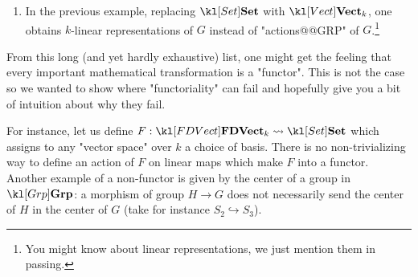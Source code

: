 \documentclass[main.tex]{subfiles}
\begin{document}
\begin{exmps}
\begin{enumerate}
		\item In the previous example, replacing $\catSet$ with $\catVect{k}$, one obtains $k$-linear representations of $G$ instead of "actions@@GRP" of $G$.\footnote{You might know about linear representations, we just mention them in passing.}
	\end{enumerate}
\end{exmps}
\begin{rem}
    From this long (and yet hardly exhaustive) list, one might get the feeling that every important mathematical transformation is a "functor". This is not the case so we wanted to show where "functoriality" can fail and hopefully give you a bit of intuition about why they fail.
    
    For instance, let us define $F: \catFDVect{k} \rightsquigarrow \catSet$ which assigns to any "vector space" over $k$ a choice of basis. There is no non-trivializing way to define an action of $F$ on linear maps which make $F$ into a functor. Another example of a non-functor is given by the center of a group in $\catGrp$: a morphism of group $H \to G$ does not necessarily send the center of $H$ in the center of $G$ (take for instance $S_2 \hookrightarrow S_3$).
\end{rem}
\end{document}
